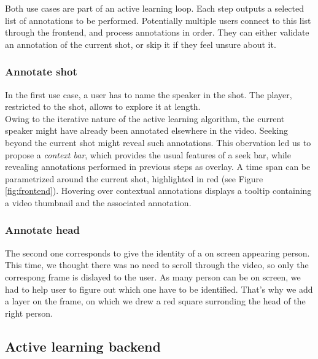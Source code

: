 \documentclass[a4paper]{article}
\begin{document}
Both use cases are part of an active learning loop. Each step outputs a selected list of annotations to be performed. Potentially multiple users connect to this list through the frontend, and process annotations in order. They can either validate an annotation of the current shot, or skip it if they feel unsure about it.



\subsubsection{Annotate shot} \label{sec:shot}
In the first use case, a user has to name the speaker in the shot. The player, restricted to the shot, allows to explore it at length.\\
Owing to the iterative nature of the active learning algorithm, the current speaker might have already been annotated elsewhere in the video. Seeking beyond the current shot might reveal such annotations. This obervation led us to propose a \emph{context bar}, which provides the usual features of a seek bar, while revealing annotations performed in previous steps as overlay. A time span can be parametrized around the current shot, highlighted in red (see Figure \ref{fig:frontend}). Hovering over contextual annotations displays a tooltip containing a video thumbnail and the associated annotation.\\

\subsubsection{Annotate head} \label{sec:head}
The second one corresponds to give the identity of a on screen appearing person. This time, we thought there was no need to scroll through the video, so only the correspong frame is dislayed to the user. As many person can be on screen, we had to help user to figure out which one have to be identified. That's why we add a layer on the frame, on which we drew a red square surronding the head of the right person.\\



      \subsection{Active learning backend}
\end{document}
